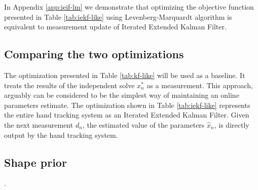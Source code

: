 In Appendix \ref{app:ieif-lm} we demonstrate that optimizing the objective function presented in Table \ref{tab:iekf-like} using Levenberg-Marquardt algorithm is equivalent to measurement update of Iterated Extended Kalman Filter.



\subsection{Comparing the two optimizations}
The optimization presented in Table \ref{tab:kf-like} will be used as a baseline. It treats the results of the independent solve $x_n^*$ as a measurement. This approach, arguably can be considered to be the simplest way of maintaining an online parameters estimate. 
The optimization shown in Table \ref{tab:iekf-like} represents the entire hand tracking system as an Iterated Extended Kalman Filter. Given the next measurement $d_n$, the estimated value of the parameters $\hat{x}_n$,  is directly output by the hand tracking system.

\subsection{Shape prior}
\label{sec:shapeprior}
. 